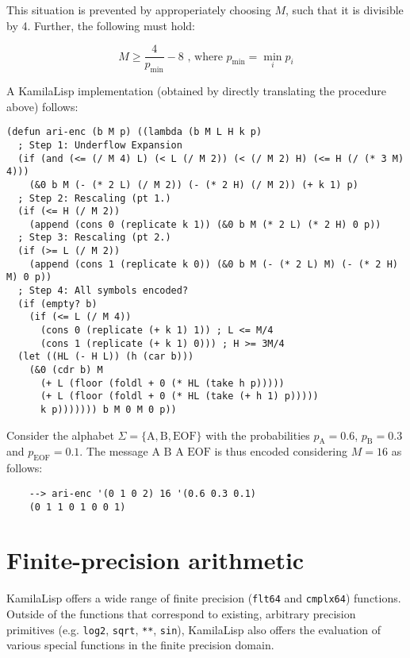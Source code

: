 This situation is prevented by approperiately choosing $M$, such that it is divisible by 4. Further, the following must hold:

$$
M \geq \frac{4}{p_\text{min}} - 8 \text{  , where  } p_\text{min} = \min_{i} p_i
$$

A KamilaLisp implementation (obtained by directly translating the procedure above) follows:

\begin{Verbatim}
(defun ari-enc (b M p) ((lambda (b M L H k p)
  ; Step 1: Underflow Expansion
  (if (and (<= (/ M 4) L) (< L (/ M 2)) (< (/ M 2) H) (<= H (/ (* 3 M) 4)))
    (&0 b M (- (* 2 L) (/ M 2)) (- (* 2 H) (/ M 2)) (+ k 1) p)
  ; Step 2: Rescaling (pt 1.)
  (if (<= H (/ M 2))
    (append (cons 0 (replicate k 1)) (&0 b M (* 2 L) (* 2 H) 0 p))
  ; Step 3: Rescaling (pt 2.)
  (if (>= L (/ M 2))
    (append (cons 1 (replicate k 0)) (&0 b M (- (* 2 L) M) (- (* 2 H) M) 0 p))
  ; Step 4: All symbols encoded?
  (if (empty? b)
    (if (<= L (/ M 4))
      (cons 0 (replicate (+ k 1) 1)) ; L <= M/4
      (cons 1 (replicate (+ k 1) 0))) ; H >= 3M/4
  (let ((HL (- H L)) (h (car b)))
    (&0 (cdr b) M
      (+ L (floor (foldl + 0 (* HL (take h p)))))
      (+ L (floor (foldl + 0 (* HL (take (+ h 1) p)))))
      k p))))))) b M 0 M 0 p))
\end{Verbatim}

Consider the alphabet $\Sigma = \{\text{A}, \text{B}, \text{EOF}\}$ with the probabilities $p_\text{A} = 0.6$, $p_\text{B} = 0.3$ and $p_\text{EOF} = 0.1$. The message $\text{A B A EOF}$ is thus encoded considering $M = 16$ as follows:

\begin{Verbatim}
    --> ari-enc '(0 1 0 2) 16 '(0.6 0.3 0.1)
    (0 1 1 0 1 0 0 1)
\end{Verbatim}

\section{Finite-precision arithmetic}

KamilaLisp offers a wide range of finite precision (\verb|flt64| and \verb|cmplx64|) functions. Outside of the functions that correspond to existing, arbitrary precision primitives (e.g. \verb|log2|, \verb|sqrt|, \verb|**|, \verb|sin|), KamilaLisp also offers the evaluation of various special functions in the finite precision domain. 
